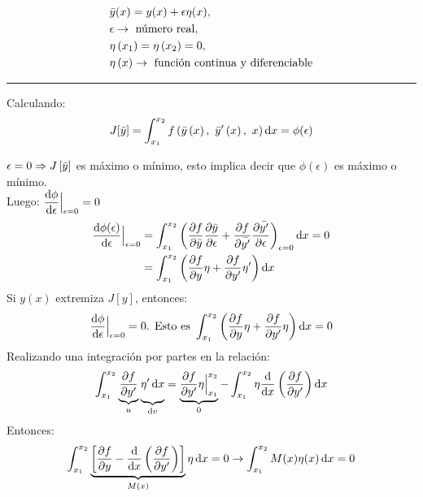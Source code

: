 \documentclass[../main]{subfiles}
\begin{document}
\noindent\begin{minipage}{.45\textwidth}
\begin{align*}
    &\Bar{y}(x)=y(x)+\epsilon\eta (x),\\
    &\epsilon \rightarrow \text{ número real},\\
    &\eta\left(x_1\right)=\eta\left(x_2\right)=0,\\
    &\eta\left(x\right)\rightarrow \text{ función continua y diferenciable}
\end{align*}
\end{minipage}
\begin{minipage}{.45\textwidth}
  \centering
  \rule{4cm}{3cm}
  \label{fig:figure}
\end{minipage}

Calculando:
\begin{align*}
    J[\Bar{y}]=\int_{x_{1}}^{x_{2}}f\left(\Bar{y}\left(x\right),\ \Bar{y}'\left(x\right),\ x\right)\dd{x}=\phi(\epsilon)
\end{align*}

$\displaystyle\epsilon=0\Rightarrow J\left[\Bar{y}\right]$ es máximo o mínimo, esto implica decir que $\phi(\epsilon)$ es máximo o mínimo.\\[6pt]
Luego: $\displaystyle\dv{\phi}{\epsilon}\Big|_{\epsilon=0}=0$
\begin{align*}
    \dv{\phi(\epsilon)}{\epsilon}\Big|_{\epsilon=0}&=\int_{x_{1}}^{x_{2}} \left(\pdv{f}{\Bar{y}}\pdv{\Bar{y}}{\epsilon}+\pdv{f}{\Bar{y'}}\pdv{\Bar{y'}}{\epsilon}\right)_{\epsilon=0} \dd{x}=0\\
    &=\int_{x_{1}}^{x_{2}} \left(\pdv{f}{y}\eta+\pdv{f}{y'}\eta'\right)\dd{x}
\end{align*}
Si $\displaystyle y(x)$ extremiza $\displaystyle J\left[y\right]$, entonces:
\begin{align*}
    \dv{\phi}{\epsilon}\Big|_{\epsilon=0}=0\text{. Esto es }\int_{x_{1}}^{x_{2}}\left(\pdv{f}{y}\eta+\pdv{f}{y'}\eta\right)\dd{x}=0
\end{align*}
Realizando una integración por partes en la relación:
\begin{align*}
    \int_{x_{1}}^{x_{2}} \underbrace{\pdv{f}{y'}}_u \underbrace{\vphantom{\left(\frac{a^{0.3}}{b}\right)} \eta'\dd{x}}_{\dd{v}}=\underbrace{\pdv{f}{y'}\eta\Big|_{x_1}^{x_2}}_{0} -\int_{x_{1}}^{x_{2}} \eta\dv{}{x}\left(\pdv{f}{y'}\right)\dd{x}
\end{align*}
Entonces:
\begin{align*}
    \int_{x_{1}}^{x_{2}}\underbrace{\left[\pdv{f}{y}-\dv{}{x}\left(\pdv{f}{y'}\right)\right]}_{M(x)}\eta\dd{x}=0 \rightarrow \int_{x_{1}}^{x_{2}} M(x)\eta(x)\dd{x}=0
\end{align*}
\end{document}

